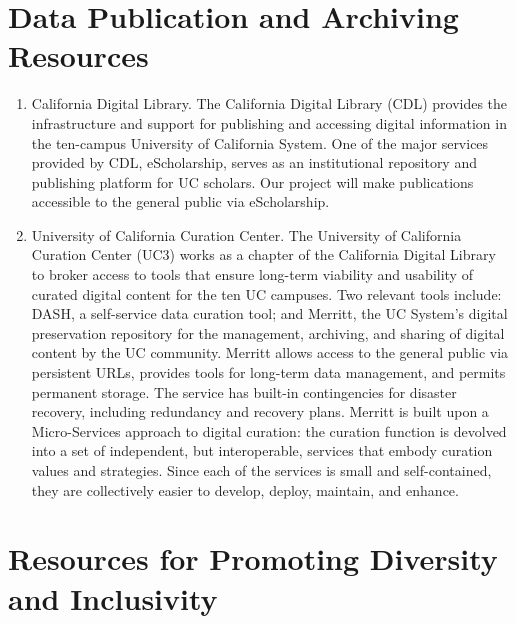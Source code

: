 \documentclass[12pt]{article}
\begin{document}
\section{Data Publication and Archiving Resources}
\begin{enumerate}
\item California Digital Library. The California Digital Library (CDL)
  provides the infrastructure and support for publishing and accessing
  digital information in the ten-campus University of California
  System. One of the major services provided by CDL, eScholarship,
  serves as an institutional repository and publishing platform for UC
  scholars. Our project will make publications accessible to the
  general public via eScholarship.

\item University of California Curation Center. The University of
  California Curation Center (UC3) works as a chapter of the
  California Digital Library to broker access to tools that ensure
  long-term viability and usability of curated digital content for the
  ten UC campuses. Two relevant tools include: DASH, a self-service
  data curation tool; and Merritt, the UC System's digital
  preservation repository for the management, archiving, and sharing
  of digital content by the UC community. Merritt allows access to the
  general public via persistent URLs, provides tools for long-term
  data management, and permits permanent storage. The service has
  built-in contingencies for disaster recovery, including redundancy
  and recovery plans. Merritt is built upon a Micro-Services approach
  to digital curation: the curation function is devolved into a set of
  independent, but interoperable, services that embody curation values
  and strategies. Since each of the services is small and
  self-contained, they are collectively easier to develop, deploy,
  maintain, and enhance.
\end{enumerate}

\section{Resources for Promoting Diversity and Inclusivity}
\end{document}
